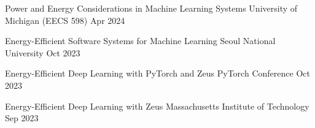 

\begin{cvtalks}

  \cvtalk
    {Power and Energy Considerations in Machine Learning Systems} %
    {University of Michigan (EECS 598)} %
    {Apr 2024} %

  \cvtalk
    {Energy-Efficient Software Systems for Machine Learning} %
    {Seoul National University} %
    {Oct 2023} %

  \cvtalk
    {Energy-Efficient Deep Learning with PyTorch and Zeus} %
    {PyTorch Conference} %
    {Oct 2023} %

  \cvtalk
    {Energy-Efficient Deep Learning with Zeus} %
    {Massachusetts Institute of Technology} %
    {Sep 2023} %

\end{cvtalks}
